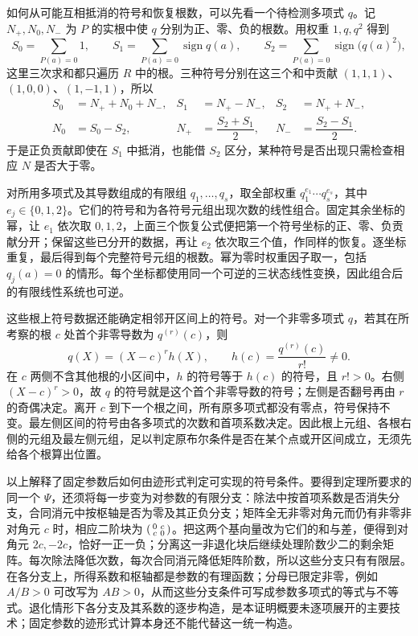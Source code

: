 \begin{proofsketch}
	如何从可能互相抵消的符号和恢复根数，可以先看一个待检测多项式 \(q\)。记 \(N_+,N_0,N_-\) 为 \(P\) 的实根中使 \(q\) 分别为正、零、负的根数。用权重 \(1,q,q^2\) 得到
	\[
		S_0=\sum_{P(a)=0}1,\qquad S_1=\sum_{P(a)=0}\operatorname{sign}q(a),\qquad S_2=\sum_{P(a)=0}\operatorname{sign}\bigl(q(a)^2\bigr),
	\]
	这里三次求和都只遍历 \(R\) 中的根。三种符号分别在这三个和中贡献 \((1,1,1)\)、\((1,0,0)\)、\((1,-1,1)\)，所以
	\[
		\begin{aligned}
			S_0&=N_++N_0+N_-,& S_1&=N_+-N_-,& S_2&=N_++N_-,\\
			N_0&=S_0-S_2,& N_+&=\dfrac{S_2+S_1}{2},& N_-&=\dfrac{S_2-S_1}{2}.
		\end{aligned}
	\]
	于是正负贡献即使在 \(S_1\) 中抵消，也能借 \(S_2\) 区分，某种符号是否出现只需检查相应 \(N\) 是否大于零。

	对所用多项式及其导数组成的有限组 \(q_1,\ldots,q_s\)，取全部权重 \(q_1^{e_1}\cdots q_s^{e_s}\)，其中 \(e_j\in\{0,1,2\}\)。它们的符号和为各符号元组出现次数的线性组合。固定其余坐标的幂，让 \(e_1\) 依次取 \(0,1,2\)，上面三个恢复公式便把第一个符号坐标的正、零、负贡献分开；保留这些已分开的数据，再让 \(e_2\) 依次取三个值，作同样的恢复。逐坐标重复，最后得到每个完整符号元组的根数。幂为零时权重因子取一，包括 \(q_j(a)=0\) 的情形。每个坐标都使用同一个可逆的三状态线性变换，因此组合后的有限线性系统也可逆。

	这些根上符号数据还能确定相邻开区间上的符号。对一个非零多项式 \(q\)，若其在所考察的根 \(c\) 处首个非零导数为 \(q^{(r)}(c)\)，则
	\[
		q(X)=(X-c)^r h(X),\qquad h(c)=\frac{q^{(r)}(c)}{r!}\neq0.
	\]
	在 \(c\) 两侧不含其他根的小区间中，\(h\) 的符号等于 \(h(c)\) 的符号，且 \(r!>0\)。右侧 \((X-c)^r>0\)，故 \(q\) 的符号就是这个首个非零导数的符号；左侧是否翻号再由 \(r\) 的奇偶决定。离开 \(c\) 到下一个根之间，所有原多项式都没有零点，符号保持不变。最左侧区间的符号由各多项式的次数和首项系数决定。因此根上元组、各根右侧的元组及最左侧元组，足以判定原布尔条件是否在某个点或开区间成立，无须先给各个根算出位置。

	以上解释了固定参数后如何由迹形式判定可实现的符号条件。要得到定理所要求的同一个 \(\Psi\)，还须将每一步变为对参数的有限分支：除法中按首项系数是否消失分支，合同消元中按枢轴是否为零及其正负分支；矩阵全无非零对角元而仍有非零非对角元 \(c\) 时，相应二阶块为 \(\begin{psmallmatrix}0&c\\c&0\end{psmallmatrix}\)。把这两个基向量改为它们的和与差，便得到对角元 \(2c,-2c\)，恰好一正一负；分离这一非退化块后继续处理阶数少二的剩余矩阵。每次除法降低次数，每次合同消元降低矩阵阶数，所以这些分支只有有限层。在各分支上，所得系数和枢轴都是参数的有理函数；分母已限定非零，例如 \(A/B>0\) 可改写为 \(AB>0\)，从而这些分支条件可写成参数多项式的等式与不等式。退化情形下各分支及其系数的逐步构造，是本证明概要未逐项展开的主要技术；固定参数的迹形式计算本身还不能代替这一统一构造。


\end{proofsketch}
